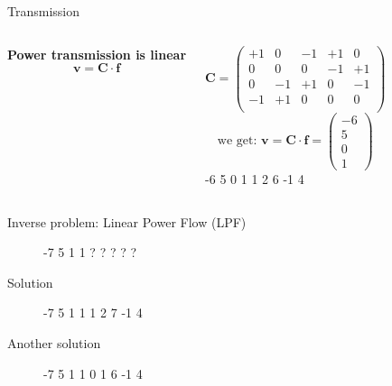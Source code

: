 \documentclass[10pt]{beamer}
\newcommand{\mat}[1]{\ensuremath{\boldsymbol{{#1}}}}
\begin{document}
\begin{frame}{Transmission}
    \begin{columns}[T,onlytextwidth]
    {
    \begin{block}{\textbf{Power transmission is linear}}
        \[\mat{v} = \mat{C}\cdot \mat{f}\]
      \end{block}
      }
    \[\mat{C}=\begin{pmatrix}
    +1& 0&-1&+1& 0\\
     0& 0& 0&-1&+1\\
     0&-1&+1& 0&-1\\
    -1&+1& 0& 0& 0\\
    \end{pmatrix}\]
    \[\text{we get: } \mat{v}=\mat{C}\cdot\mat{f}=\begin{pmatrix}
    -6\\5\\0\\1
    \end{pmatrix}\]
    \graafjeduitsland
        {-6}
        {5}
        {0}
        {1}
        {1}
        {2}
        {6}
        {-1}
        {4}
    \end{columns}
\end{frame}

\begin{frame}{Inverse problem: Linear Power Flow (LPF)}
    \begin{figure}
        \centering
        \graafjeduitsland
        {-7}
        {5}
        {1}
        {1}
        {?}
        {?}
        {?}
        {?}
        {?}
    \end{figure}
\end{frame}

\begin{frame}{Solution}
    \begin{figure}
        \centering
        \graafjeduitsland
        {-7}
        {5}
        {1}
        {1}
        {1}
        {2}
        {7}
        {-1}
        {4}
    \end{figure}
\end{frame}

\begin{frame}{Another solution}
    \begin{figure}
        \centering
        \graafjeduitsland
        {-7}
        {5}
        {1}
        {1}
        {0}
        {1}
        {6}
        {-1}
        {4}
    \end{figure}
\end{frame}
\end{document}
